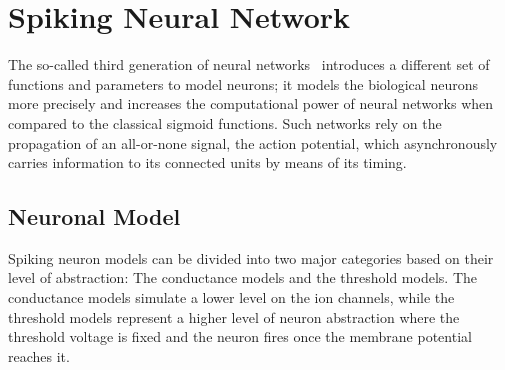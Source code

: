 %

\section{Spiking Neural Network}
\label{sec:SNNintro}
The so-called third generation of neural networks~\cite{maass1997networks} introduces a different set of functions and parameters to model neurons;
it models the biological neurons more precisely and increases the computational power of neural networks when compared to the classical sigmoid functions.
Such networks rely on the propagation of an all-or-none signal, the action potential, which asynchronously carries information to its connected units by means of its timing.
\subsection{Neuronal Model}
Spiking neuron models can be divided into two major categories \cite{gernstbook} based on their level of abstraction: The conductance models and the threshold models.
The conductance models simulate a lower level on the ion channels, while the threshold models represent a higher level of neuron abstraction where the threshold voltage is fixed and the neuron fires once the membrane potential reaches it.

